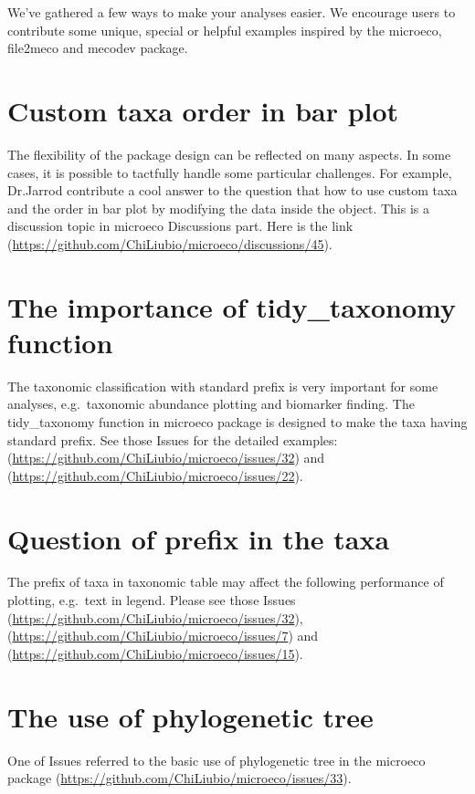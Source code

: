\documentclass[
]{book}
\begin{document}
We've gathered a few ways to make your analyses easier.
We encourage users to contribute some unique, special or helpful examples inspired by the microeco, file2meco and mecodev package.

\hypertarget{custom-taxa-order-in-bar-plot}{%
\section{Custom taxa order in bar plot}\label{custom-taxa-order-in-bar-plot}}

The flexibility of the package design can be reflected on many aspects.
In some cases, it is possible to tactfully handle some particular challenges.
For example, Dr.Jarrod contribute a cool answer to the question that how to use custom taxa and the order in bar plot by modifying the data inside the object.
This is a discussion topic in microeco Discussions part. Here is the link (\url{https://github.com/ChiLiubio/microeco/discussions/45}).

\hypertarget{the-importance-of-tidy_taxonomy-function}{%
\section{The importance of tidy\_taxonomy function}\label{the-importance-of-tidy_taxonomy-function}}

The taxonomic classification with standard prefix is very important for some analyses,
e.g.~taxonomic abundance plotting and biomarker finding.
The tidy\_taxonomy function in microeco package is designed to make the taxa having standard prefix.
See those Issues for the detailed examples: (\url{https://github.com/ChiLiubio/microeco/issues/32}) and (\url{https://github.com/ChiLiubio/microeco/issues/22}).

\hypertarget{question-of-prefix-in-the-taxa}{%
\section{Question of prefix in the taxa}\label{question-of-prefix-in-the-taxa}}

The prefix of taxa in taxonomic table may affect the following performance of plotting, e.g.~text in legend.
Please see those Issues (\url{https://github.com/ChiLiubio/microeco/issues/32}), (\url{https://github.com/ChiLiubio/microeco/issues/7})
and (\url{https://github.com/ChiLiubio/microeco/issues/15}).

\hypertarget{the-use-of-phylogenetic-tree}{%
\section{The use of phylogenetic tree}\label{the-use-of-phylogenetic-tree}}

One of Issues referred to the basic use of phylogenetic tree in the microeco package (\url{https://github.com/ChiLiubio/microeco/issues/33}).

  
\end{document}
